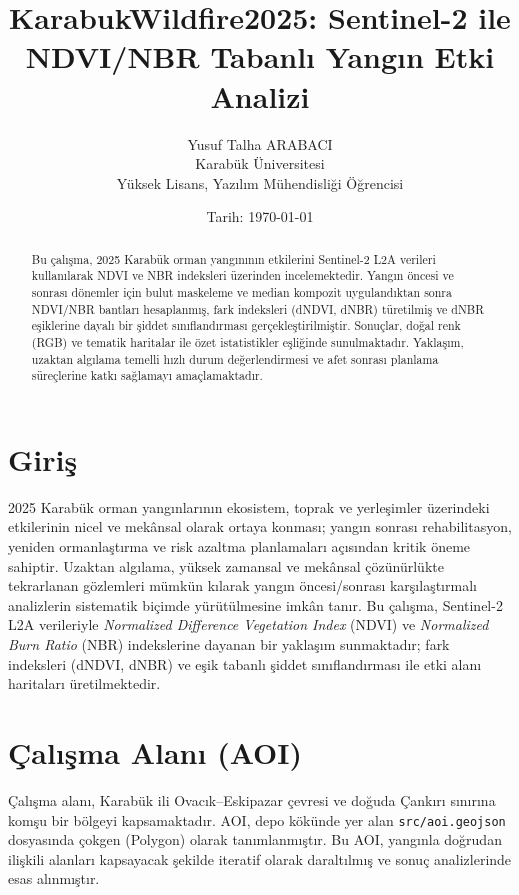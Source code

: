 \documentclass[11pt,a4paper]{article}
\title{KarabukWildfire2025: Sentinel-2 ile NDVI/NBR Tabanlı Yangın Etki Analizi}
\author{Yusuf Talha ARABACI\\Karabük Üniversitesi\\Yüksek Lisans, Yazılım Mühendisliği Öğrencisi}
\date{Tarih: \today}
\begin{document}
\maketitle
\thispagestyle{empty}

\clearpage
\tableofcontents
\clearpage

\begin{abstract}
Bu çalışma, 2025 Karabük orman yangınının etkilerini Sentinel-2 L2A verileri kullanılarak
NDVI ve NBR indeksleri üzerinden incelemektedir. Yangın öncesi ve sonrası dönemler için
bulut maskeleme ve median kompozit uygulandıktan sonra NDVI/NBR bantları hesaplanmış,
fark indeksleri (dNDVI, dNBR) türetilmiş ve dNBR eşiklerine dayalı bir şiddet sınıflandırması
gerçekleştirilmiştir. Sonuçlar, doğal renk (RGB) ve tematik haritalar ile özet istatistikler
eşliğinde sunulmaktadır. Yaklaşım, uzaktan algılama temelli hızlı durum değerlendirmesi ve
afet sonrası planlama süreçlerine katkı sağlamayı amaçlamaktadır.
\end{abstract}

\clearpage

\section{Giriş}
2025 Karabük orman yangınlarının ekosistem, toprak ve yerleşimler üzerindeki etkilerinin
nicel ve mekânsal olarak ortaya konması; yangın sonrası rehabilitasyon, yeniden
ormanlaştırma ve risk azaltma planlamaları açısından kritik öneme sahiptir. Uzaktan
algılama, yüksek zamansal ve mekânsal çözünürlükte tekrarlanan gözlemleri mümkün kılarak
yangın öncesi/sonrası karşılaştırmalı analizlerin sistematik biçimde yürütülmesine imkân
tanır. Bu çalışma, Sentinel-2 L2A verileriyle \emph{Normalized Difference Vegetation Index}
(NDVI) ve \emph{Normalized Burn Ratio} (NBR) indekslerine dayanan bir yaklaşım
sunmaktadır; fark indeksleri (dNDVI, dNBR) ve eşik tabanlı şiddet sınıflandırması ile
etki alanı haritaları üretilmektedir.

\section{Çalışma Alanı (AOI)}
Çalışma alanı, Karabük ili Ovacık--Eskipazar çevresi ve doğuda Çankırı sınırına
komşu bir bölgeyi kapsamaktadır. AOI, depo kökünde yer alan \texttt{src/aoi.geojson}
dosyasında çokgen (Polygon) olarak tanımlanmıştır. Bu AOI, yangınla doğrudan ilişkili
alanları kapsayacak şekilde iteratif olarak daraltılmış ve sonuç analizlerinde esas
alınmıştır.
\end{document}
